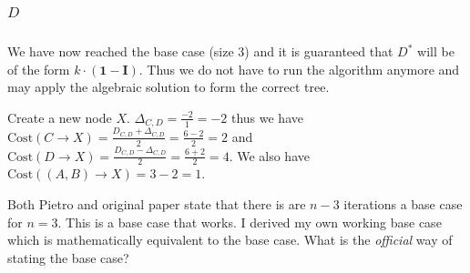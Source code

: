 \documentclass[10pt,\jkfside,a4paper]{article}
\begin{document}
\begin{enumerate}
\begin{itemize}
\begin{table}[H]
\begin{tabular}{ccccc}
            \end{tabular}

            \caption{$D$}

        \end{table}

        We have now reached the base case (size 3) and it is guaranteed that $D^*$ will be of the form $k \cdot (\mathbf{1} - \mathbf{I})$. Thus we do not have to run the algorithm anymore and may apply the
        algebraic solution to form the correct tree.

        Create a new node $X$. $\Delta_{C, D} = \frac{-2}{1} = -2$ thus we have $\mathrm{Cost}(C \to X) = \frac{D_{C, D} + \Delta_{C, D}}{2} = \frac{6 - 2}{2} = 2$ and
        $\mathrm{Cost}(D \to X) = \frac{D_{C, D} - \Delta_{C, D}}{2} = \frac{6 + 2}{2} = 4$. We also have $\mathrm{Cost}((A, B) \to X) = 3 - 2 = 1$.

        \begin{figure}[H]
            \centering


        \end{figure}

        \begin{question}

            Both Pietro and original paper state that there is are $n - 3$ iterations a base case for $n = 3$. This is a base case that works. I derived my own working base case which is mathematically equivalent
            to the base case. What is the \textit{official} way of stating the base case?

        \end{question}


\end{itemize}
\end{enumerate}
\end{document}

